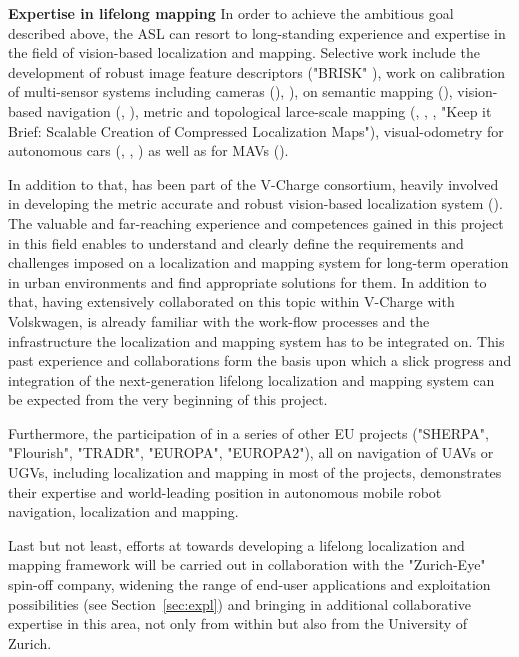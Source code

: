 {\bf Expertise in lifelong mapping}
In order to achieve the ambitious goal described above, the ASL can resort to long-standing experience and expertise in the field of vision-based localization and mapping. Selective work include the development of robust image feature descriptors ("BRISK" \cite{leutenegger2011brisk}), work on calibration of multi-sensor systems including cameras (\cite{furgale2013unified}), \cite{heng2014infrastructure}), on semantic mapping (\cite{vasudevan2007cognitive}), vision-based navigation (\cite{blosch2010vision}, \cite{lynen2013tightly}), metric and topological larce-scale mapping (\cite{lynenplaceless}, \cite{cieslewskimap}, \cite{dymczyk2015gist}, "Keep it Brief: Scalable Creation of Compressed Localization Maps"), visual-odometry for autonomous cars (\cite{leutenegger2014keyframe}, \cite{scaramuzza2008appearance}, \cite{scaramuzza2009real}) as well as for MAVs (\cite{weiss2012real}).

In addition to that, \ETHZ has been part of the V-Charge consortium, heavily involved in developing the metric accurate and robust vision-based localization system (\cite{muehlfellner2013evaluation}). The valuable and far-reaching experience and competences gained in this project in this field enables \ETHZ to understand and clearly define the requirements and challenges imposed on a localization and mapping system for long-term operation in urban environments and find appropriate solutions for them. In addition to that, having extensively collaborated on this topic within V-Charge with Volskwagen, \ETHZ is already familiar with the work-flow processes and the infrastructure the localization and mapping system has to be integrated on. This past experience and collaborations form the basis upon which a slick progress and integration of the next-generation lifelong localization and mapping system can be expected from the very beginning of this project.

Furthermore, the participation of \ETHZ in a series of other EU projects ("SHERPA", "Flourish", "TRADR", "EUROPA", "EUROPA2"), all on navigation of UAVs or UGVs, including localization and mapping in most of the projects, demonstrates their expertise and world-leading position in autonomous mobile robot navigation, localization and mapping.

Last but not least, efforts at \ETHZ towards developing a lifelong localization and mapping framework will be carried out in collaboration with the "Zurich-Eye" spin-off company, widening the range of end-user applications and exploitation possibilities (see Section~\ref{sec:expl}) and bringing in additional collaborative expertise in this area, not only from within \ETHZ but also from the University of Zurich. 

